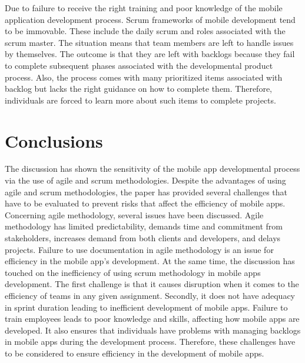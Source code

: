 \documentclass{article}
\begin{document}
Due to failure to receive the right training and poor knowledge of the mobile application development process. Scrum frameworks of mobile development tend to be immovable. These include the daily scrum and roles associated with the scrum master. The situation means that team members are left to handle issues by themselves. The outcome is that they are left with backlogs because they fail to complete subsequent phases associated with the developmental product process. Also, the process comes with many prioritized items associated with backlog but lacks the right guidance on how to complete them. Therefore, individuals are forced to learn more about such items to complete projects. 



\section*{Conclusions}
The discussion has shown the sensitivity of the mobile app developmental process via the use of agile and scrum methodologies. Despite the advantages of using agile and scrum methodologies, the paper has provided several challenges that have to be evaluated to prevent risks that affect the efficiency of mobile apps. Concerning agile methodology, several issues have been discussed. Agile methodology has limited predictability, demands time and commitment from stakeholders, increases demand from both clients and developers, and delays projects. Failure to use documentation in agile methodology is an issue for efficiency in the mobile app’s development. At the same time, the discussion has touched on the inefficiency of using scrum methodology in mobile apps development. The first challenge is that it causes disruption when it comes to the efficiency of teams in any given assignment. Secondly, it does not have adequacy in sprint duration leading to inefficient development of mobile apps. Failure to train employees leads to poor knowledge and skills, affecting how mobile apps are developed. It also ensures that individuals have problems with managing backlogs in mobile apps during the development process. Therefore, these challenges have to be considered to ensure efficiency in the development of mobile apps. 

\medskip

\printbibliography
\end{document}
